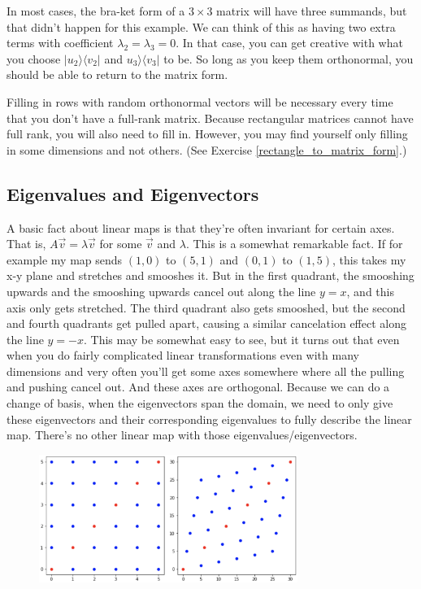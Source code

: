 \documentclass{amsbook}
\begin{document}
In most cases, the bra-ket form of a $3\times3$ matrix will have three summands, but that didn't happen for this example.  We can think of this as having two extra terms with coefficient $\lambda_2=\lambda_3=0$.  In that case, you can get creative with what you choose $|u_2\rangle\langle v_2|$ and $u_3\rangle\langle v_3|$ to be.  So long as you keep them orthonormal, you should be able to return to the matrix form.

Filling in rows with random orthonormal vectors will be necessary every time that you don't have a full-rank matrix.  Because rectangular matrices cannot have full rank, you will also need to fill in.  However, you may find yourself only filling in some dimensions and not others.  (See Exercise \ref{rectangle_to_matrix_form}.)

\subsection{Eigenvalues and Eigenvectors}

A basic fact about linear maps is that they're often invariant for certain axes.  That is, $A\vec v=\lambda\vec v$ for some $\vec v$ and $\lambda$.  This is a somewhat remarkable fact.  If for example my map sends $(1, 0)$ to $(5, 1)$ and $(0, 1)$ to $(1, 5)$, this takes my x-y plane and stretches and smooshes it.  But in the first quadrant, the smooshing upwards and the smooshing upwards cancel out along the line $y=x$, and this axis only gets stretched.  The third quadrant also gets smooshed, but the second and fourth quadrants get pulled apart, causing a similar cancelation effect along the line $y=-x$.  This may be somewhat easy to see, but it turns out that even when you do fairly complicated linear transformations even with many dimensions and very often you'll get some axes somewhere where all the pulling and pushing cancel out.  And these axes are orthogonal.  Because we can do a change of basis, when the eigenvectors span the domain, we need to only give these eigenvectors and their corresponding eigenvalues to fully describe the linear map.  There's no other linear map with those eigenvalues/eigenvectors.

\begin{figure}
\centering
\includegraphics[width=0.75\textwidth]{eigenvectors}
\end{figure}
\end{document}
